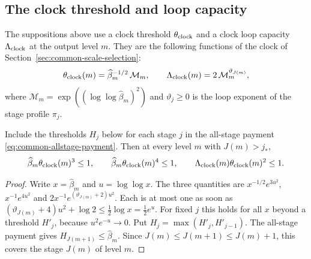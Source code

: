 \subsection{The clock threshold and loop capacity}
\label{subsec:rank-root-clock-threshold}

The suppositions above use a clock threshold $\theta_{\rm clock}$ and a
clock loop capacity $\Lambda_{\rm clock}$ at the output level $m$. They
are the following functions of the clock of
Section~\ref{sec:common-scale-selection}:
\[
 \theta_{\rm clock}(m)=\widehat\beta_m^{-1/2}\,\mathcal M_m,\qquad
 \Lambda_{\rm clock}(m)=2\,\mathcal M_m^{\vartheta_{J(m)}},
\]
where $\mathcal M_m=\exp((\log\log\widehat\beta_m)^2)$ and
$\vartheta_j\ge0$ is the loop exponent of the stage profile $\pi_j$.

\begin{lemma}
\label{lem:rank-root-late-scale}
Include the thresholds $H_j$ below for each stage $j$ in
the all-stage payment \eqref{eq:common-allstage-payment}. Then at every
level $m$ with $J(m)>j_*$,
\[
 \widehat\beta_m\theta_{\rm clock}(m)^3\le1,\qquad
 \widehat\beta_m\theta_{\rm clock}(m)^4\le1,\qquad
 \Lambda_{\rm clock}(m)\theta_{\rm clock}(m)^2\le1 .
\]
\end{lemma}
\begin{proof}
Write $x=\widehat\beta_m$ and $u=\log\log x$. The three quantities are
$x^{-1/2}e^{3u^2}$, $x^{-1}e^{4u^2}$ and
$2x^{-1}e^{(\vartheta_{J(m)}+2)u^2}$. Each is at most one as soon as
$(\vartheta_{J(m)}+4)u^2+\log2\le\tfrac12\log x=\tfrac12e^{u}$. For fixed
$j$ this holds for all $x$ beyond a threshold $H'_j$, because
$u^2e^{-u}\to0$. Put $H_j=\max(H'_j,H'_{j-1})$. The all-stage payment
gives $H_{J(m+1)}\le\widehat\beta_m$. Since $J(m)\le J(m+1)\le J(m)+1$,
this covers the stage $J(m)$ of level $m$.
\end{proof}
